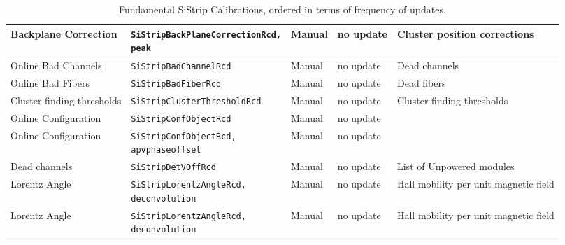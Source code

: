 \begin{table}[h!]
\begin{adjustbox}{max width=\textwidth}
\begin{tabular}{p{3.4cm}|p{4.6cm}|p{2.5cm}|p{2.5cm}|p{3.5cm}}
      Backplane Correction       & \parbox[t]{5cm}{\texttt{SiStripBackPlaneCorrectionRcd,}\\\texttt{peak}}           &   Manual                   & no update                               & Cluster position corrections   \\ \hline          
      Online Bad Channels        & \texttt{SiStripBadChannelRcd}           &   Manual                                & no update                               & Dead channels  \\ \hline                                      
      Online Bad Fibers          & \texttt{SiStripBadFiberRcd}             &   Manual                                & no update                               & Dead fibers  \\ \hline                                        
      Cluster finding thresholds & \texttt{SiStripClusterThresholdRcd}     &   Manual                                & no update                               & Cluster finding thresholds   \\ \hline
      Online Configuration       & \texttt{SiStripConfObjectRcd}           &   Manual                                & no update                               &    \\ \hline                            
      Online Configuration       & \parbox[t]{5cm}{\texttt{SiStripConfObjectRcd,}\\\texttt{apvphaseoffset}}  &   Manual   & no update                               &  \\ \hline
      Dead channels              & \texttt{SiStripDetVOffRcd}              &   Manual                                & no update                               & List of Unpowered modules  \\ \hline
      Lorentz Angle              & \parbox[t]{5cm}{\texttt{SiStripLorentzAngleRcd,}\\\texttt{deconvolution}} &   Manual & no update & Hall mobility per unit magnetic field  \\ \hline
      Lorentz Angle              & \parbox[t]{5cm}{\texttt{SiStripLorentzAngleRcd,}\\\texttt{deconvolution}} &   Manual & no update & Hall mobility per unit magnetic field  \\
    \end{tabular}
    \end{adjustbox}
    \caption{Fundamental SiStrip Calibrations, ordered in terms of frequency of updates.}
    \label{tab:StripCalibrations_critical}
\end{table}

